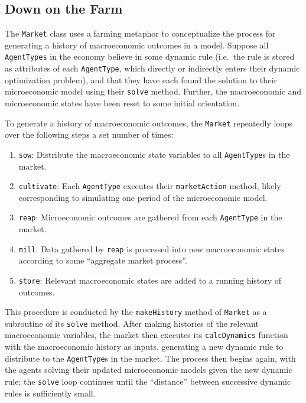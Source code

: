 \documentclass[12pt,titlepage,letterpaper]{econtex}
\begin{document}
\subsection{Down on the Farm}\label{sec:DownOnTheFarm}

The \texttt{Market} class uses a farming metaphor to conceptualize the process for generating a history of macroeconomic outcomes in a model.  Suppose all \texttt{AgentTypes} in the economy believe in some dynamic rule (i.e.\ the rule is stored as attributes of each \texttt{AgentType}, which directly or indirectly enters their dynamic optimization problem), and that they have each found the solution to their microeconomic model using their \texttt{solve} method.  Further, the macroeconomic and microeconomic states have been reset to some initial orientation.

To generate a history of macroeconomic outcomes, the \texttt{Market} repeatedly loops over the following steps a set number of times:
\begin{enumerate}
\item \texttt{sow}: Distribute the macroeconomic state variables to all \texttt{AgentType}s in the market.

\item \texttt{cultivate}: Each \texttt{AgentType} executes their \texttt{marketAction} method, likely corresponding to simulating one period of the microeconomic model.

\item \texttt{reap}: Microeconomic outcomes are gathered from each \texttt{AgentType} in the market.

\item \texttt{mill}: Data gathered by \texttt{reap} is processed into new macroeconomic states according to some ``aggregate market process''.

\item \texttt{store}: Relevant macroeconomic states are added to a running history of outcomes.
\end{enumerate}
This procedure is conducted by the \texttt{makeHistory} method of \texttt{Market} as a subroutine of its \texttt{solve} method.  After making histories of the relevant macroeconomic variables, the market then executes its \texttt{calcDynamics} function with the macroeconomic history as inputs, generating a new dynamic rule to distribute to the \texttt{AgentType}s in the market.  The process then begins again, with the agents solving their updated microeconomic models given the new dynamic rule; the \texttt{solve} loop continues until the ``distance'' between successive dynamic rules is sufficiently small.
\end{document}

